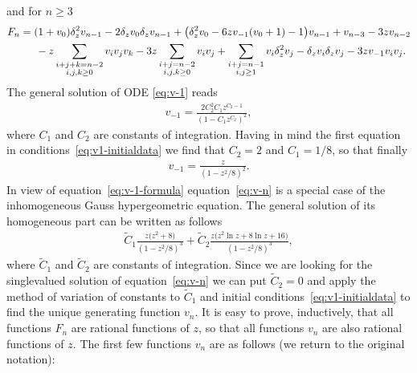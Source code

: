\documentclass[pdftex]{sigma}
\numberwithin{equation}{section}
\begin{document}
 and for $n\geq3$
\begin{gather*} F_n =(1+v_0)\delta_z^2v_{n-1}-2\delta_zv_0\delta_zv_{n-1}+\big(\delta_z^2v_0-6zv_{-1}(v_0+1)-1\big)v_{n-1}
+v_{n-3}-3zv_{n-2}\nonumber\\
\hphantom{F_n =}{} -z\sum_{\substack{i+j+k=n-2\\i,j,k\geq0}} v_iv_jv_k-3z\sum_{\substack{i+j=n-2\\i,j,k\geq0}}v_iv_j+
\sum_{\substack{i+j=n-1\\i,j\geq1}}v_i\delta_z^2v_j-\delta_zv_i\delta_zv_j-3zv_{-1}v_iv_j.%
\end{gather*}
The general solution of ODE \eqref{eq:v-1} reads
\begin{gather}\label{eq:v-1-solution}
v_{-1}=\frac{2C_2^2C_1z^{C_2-1}}{(1-C_1z^{C_2})^2},
\end{gather}
where $C_1$ and $C_2$ are constants of integration. Having in mind the first equation in conditions~\eqref{eq:v1-initialdata}
we find that $C_2=2$ and $C_1=1/8$, so that finally
\begin{gather}\label{eq:v-1-formula}
v_{-1}=\frac{z}{(1-z^2/8)^2}.
\end{gather}
In view of equation~\eqref{eq:v-1-formula} equation~\eqref{eq:v-n} is a special case of
the inhomogeneous Gauss hyper\-geo\-metric equation. The general solution of its homogeneous part can be written as follows
\begin{gather*}
{\tilde C}_1\frac{z\big(z^2+8\big)}{(1-z^2/8)^3}+{\tilde C}_2\frac{z\big(z^2\ln{z}+8\ln{z}+16\big)}{(1-z^2/8)^3},
\end{gather*}
where ${\tilde C}_1$ and ${\tilde C}_2$ are constants of integration. Since we are looking for the singlevalued solution
of equation~\eqref{eq:v-n} we can put ${\tilde C}_2=0$ and apply the method of variation of constants to ${\tilde C}_1$
and initial conditions~\eqref{eq:v1-initialdata} to find the unique generating function $v_n$. It is easy to prove,
inductively, that all functions $F_n$ are rational functions of $z$, so that all functions $v_n$ are also rational functions
of $z$. The first few functions $v_n$ are as follows (we return to the original notation):
\end{document}
